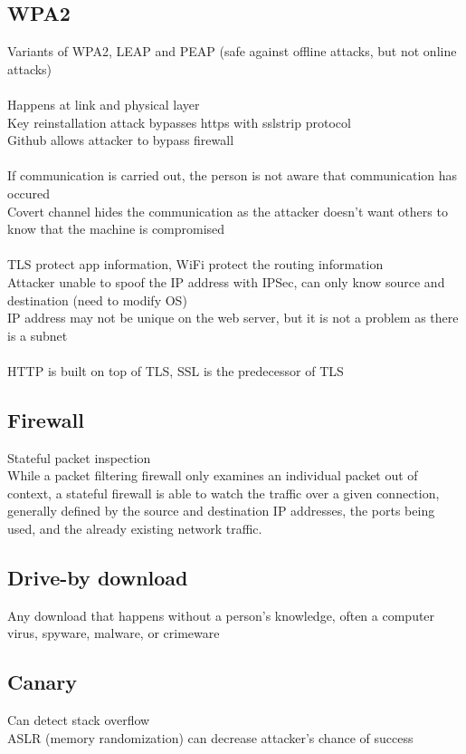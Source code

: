 \documentclass[11pt]{article}
\begin{document}
\begin{multicols*}{3}
\subsection*{WPA2}
Variants of WPA2, LEAP and PEAP (safe against offline attacks, but not online attacks)\\\\
Happens at link and physical layer\\
Key reinstallation attack bypasses https with sslstrip protocol\\
Github allows attacker to bypass firewall\\\\
If communication is carried out, the person is not aware that communication has occured\\
Covert channel hides the communication as the attacker doesn't want others to know that the machine is compromised
\\\\
TLS protect app information, WiFi protect the routing information\\
Attacker unable to spoof the IP address with IPSec, can only know source and destination (need to modify OS)\\
IP address may not be unique on the web server, but it is not a problem as there is a subnet\\\\
HTTP is built on top of TLS, SSL is the predecessor of TLS
\subsection*{Firewall}
Stateful packet inspection\\
While a packet filtering firewall only examines an individual packet out of context, a stateful firewall is able to watch the traffic over a given connection, generally defined by the source and destination IP addresses, the ports being used, and the already existing network traffic.
\subsection*	{Drive-by download}
Any download that happens without a person's knowledge, often a computer virus, spyware, malware, or crimeware
\subsection*	{Canary}
Can detect stack overflow\\
ASLR (memory randomization) can decrease attacker's chance of success
\end{multicols*}
\end{document}
